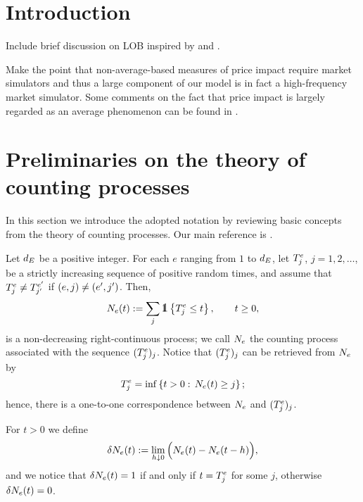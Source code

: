 \documentclass[10pt, article,table]{article}
\begin{document}
 
\maketitle
\tableofcontents

\section{Introduction}
Include brief discussion on LOB inspired by \citealp[Chapter 6]{FPR13mar} and \citealp{GPWMFH13lim}.

Make the point that non-average-based measures of  price impact require market simulators and thus a large component of our model is in fact a high-frequency market simulator. Some comments on the fact that price impact is largely regarded as an average phenomenon can be found in \citealp{BMBB19imp}. 

\section{Preliminaries on the theory of counting processes} 
In this section we introduce the adopted notation by reviewing basic concepts from the theory of counting processes. Our main reference is \citealp[Chapter 14]{DVJ08int}.

Let $\numEventTypes$ be a positive integer. For each $e$ ranging from $1$ to $\numEventTypes$, let $\arrivalTimes_{j}$, $j=1, 2, \dots$, be a strictly increasing sequence of positive random times, and assume that $\arrivalTimes_{j}\neq\arrivalTimes[e\derivative]_{j\derivative}$ if $(e,j)\neq (e\derivative,j\derivative)$. Then, 
\begin{equation*}
 \countingProc(t):= \sum_{j} \one\left\lbrace\arrivalTimes_{j}\leq t \right\rbrace, \qquad t\geq 0,
\end{equation*}
is a non-decreasing right-continuous process; we call $\countingProc$ the counting process associated with the sequence $(\arrivalTimes_{j})_j$. Notice that $(\arrivalTimes_{j})_j$ can be retrieved from $\countingProc$ by 
\begin{equation*}
 \arrivalTimes_{j} = \inf \left\lbrace t>0: \, \countingProc(t)\geq j\right\rbrace;
\end{equation*}
hence, there is a one-to-one correspondence between $\countingProc$ and $(\arrivalTimes_{j})_j$. 

For $t>0$ we define 
\begin{equation*}
 \delta\countingProc(t):= \lim_{h\downarrow 0} \Big( \countingProc(t) - \countingProc(t-h) \Big),
\end{equation*}
and we notice that $\delta \countingProc(t) = 1$ if and only if $t=\arrivalTimes_{j}$ for some $j$, otherwise $\delta \countingProc(t) = 0$.
\end{document}
